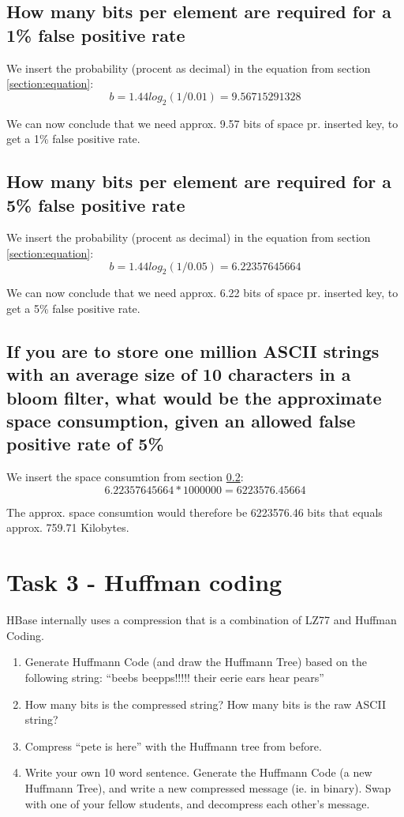 \documentclass{article}
\begin{document}
\subsection{How many bits per element are required for a 1\% false positive rate}
We insert the probability (procent as decimal) in the equation from section \ref{section:equation}:
\[ b = 1.44log_2(1/0.01) = 9.56715291328\]

We can now conclude that we need approx. 9.57 bits of space pr. inserted key, to get a 1\% false positive rate.


\subsection{How many bits per element are required for a 5\% false positive rate}
\label{section:bitspritem}
We insert the probability (procent as decimal) in the equation from section \ref{section:equation}:
\[ b = 1.44log_2(1/0.05) = 6.22357645664\]

We can now conclude that we need approx. 6.22 bits of space pr. inserted key, to get a 5\% false positive rate.

\subsection{If you are to store one million ASCII strings with an average size of 10 characters in a bloom filter, what would be the approximate space consumption, given an allowed false positive rate of 5\%}
We insert the space consumtion from section \ref{section:bitspritem}:
\[ 6.22357645664*1000000 = 6223576.45664\]

The approx. space consumtion would therefore be 6223576.46 bits that equals approx. 759.71 Kilobytes. 

\section{Task 3 - Huffman coding}
HBase internally uses a compression that is a combination of LZ77 and Huffman Coding.
\begin{enumerate}
    \item Generate Huffmann Code (and draw the Huffmann Tree) based on the following string: “beebs beepps!!!!! their eerie ears hear pears”
    \item How many bits is the compressed string? How many bits is the raw ASCII string?
    \item Compress “pete is here” with the Huffmann tree from before.
    \item Write your own 10 word sentence. Generate the Huffmann Code (a new Huffmann Tree), and write a new compressed message (ie. in binary). Swap with one of your fellow students, and decompress each other’s message.

\end{enumerate}



{}

\end{document}
